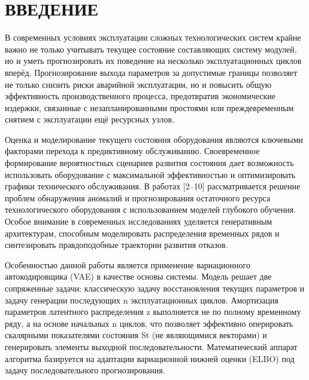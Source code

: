 \documentclass[14pt, a4paper, oneside]{extreport}
\begin{document}
\makeatletter
\renewcommand{\numberline}[1]{}
\makeatother


\setcounter{page}{6}

\tableofcontents
\clearpage



\section{ВВЕДЕНИЕ}
\vspace{1em}
В современных условиях эксплуатации сложных технологических систем крайне важно не только учитывать текущее состояние составляющих систему модулей, но и уметь прогнозировать их поведение на несколько эксплуатационных циклов вперёд. Прогнозирование выхода параметров за допустимые границы позволяет не только снизить риски аварийной эксплуатации, но и повысить общую эффективность производственного процесса, предотвратив экономические издержки, связанные с незапланированными простоями или преждевременным снятием с эксплуатации ещё ресурсных узлов.

Оценка и моделирование текущего состояния оборудования являются ключевыми факторами перехода к предиктивному обслуживанию. Своевременное формирование вероятностных сценариев развития состояния дает возможность использовать оборудование с максимальной эффективностью и оптимизировать графики технического обслуживания. В работах [2–10] рассматривается решение проблем обнаружения аномалий и прогнозирования остаточного ресурса технологического оборудования с использованием моделей глубокого обучения. Особое внимание в современных исследованиях уделяется генеративным архитектурам, способным моделировать распределения временных рядов и синтезировать правдоподобные траектории развития отказов.

Особенностью данной работы является применение вариационного автокодировщика (VAE) в качестве основы системы. Модель решает две сопряженные задачи: классическую задачу восстановления текущих параметров и задачу генерации последующих n эксплуатационных циклов. Амортизация параметров латентного распределения z выполняется не по полному временному ряду, а на основе начальных n циклов, что позволяет эффективно оперировать скалярными показателями состояния St (не являющимися векторами) и генерировать элементы выходной последовательности. 
Математический аппарат алгоритма базируется на адаптации вариационной нижней оценки (ELBO) под задачу последовательного прогнозирования.
\end{document}
